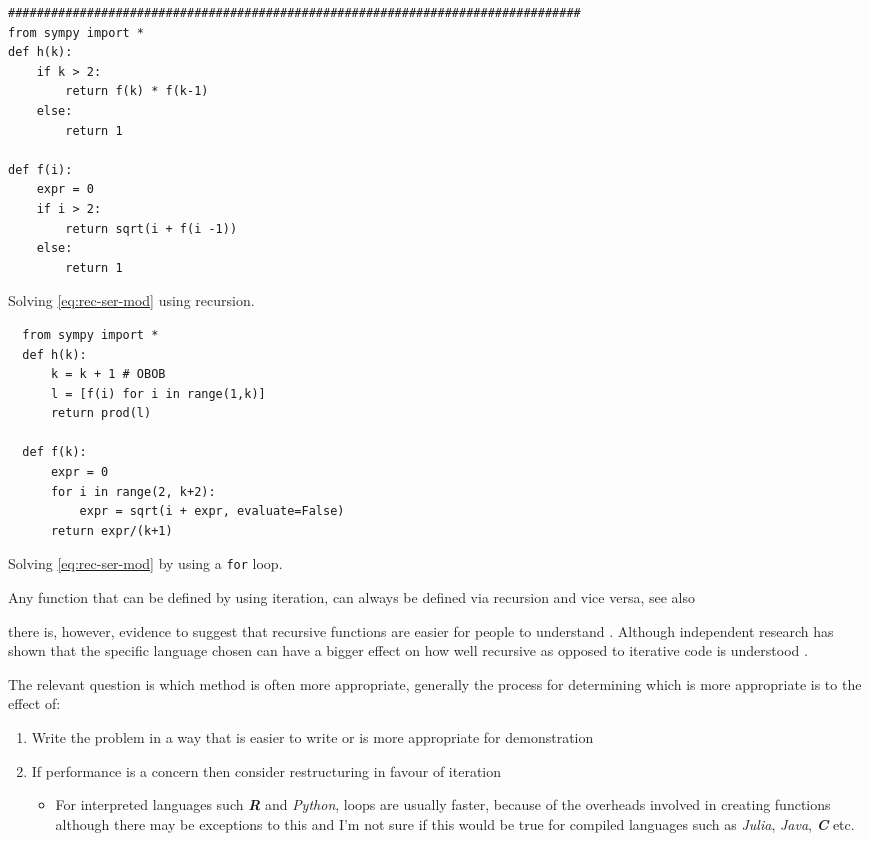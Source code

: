 \documentclass[11pt]{article}
\begin{document}
\begin{listing}[htbp]
\begin{verbatim}
################################################################################
from sympy import *
def h(k):
    if k > 2:
        return f(k) * f(k-1)
    else:
        return 1

def f(i):
    expr = 0
    if i > 2:
        return sqrt(i + f(i -1))
    else:
        return 1
\end{verbatim}
\caption{\label{rec-one}Solving \eqref{eq:rec-ser-mod} using recursion.}
\end{listing}


\begin{listing}[htbp]
\begin{verbatim}
  from sympy import *
  def h(k):
      k = k + 1 # OBOB
      l = [f(i) for i in range(1,k)]
      return prod(l)

  def f(k):
      expr = 0
      for i in range(2, k+2):
          expr = sqrt(i + expr, evaluate=False)
      return expr/(k+1)
\end{verbatim}
\caption{\label{it-one}Solving \eqref{eq:rec-ser-mod} by using a \texttt{for} loop.}
\end{listing}

Any function that can be defined by using iteration, can always be defined via
recursion and vice versa,
\cite{bohmReducingRecursionIteration1988,bohmReducingRecursionIteration1986}
see also
\cite{smolarskiMath60Notes2000,IterationVsRecursion2016}

there is, however, evidence to suggest that recursive functions are easier for people to understand \cite{benanderEmpiricalAnalysisDebugging2000} . Although independent research has shown that the specific language chosen can have a bigger effect on how well recursive as opposed to iterative code is understood \cite{sinhaCognitiveFitEmpirical1992}.

The relevant question is which method is often more appropriate, generally the process for
determining which is more appropriate is to the effect of:

\begin{enumerate}
\item Write the problem in a way that is easier to write or is more
appropriate for demonstration
\item If performance is a concern then consider restructuring in favour of iteration
\begin{itemize}
\item For interpreted languages such \textbf{\emph{R}} and \emph{Python}, loops are usually
faster, because of the overheads involved in creating functions
\cite{smolarskiMath60Notes2000} although there may be exceptions to this and
I'm not sure if this would be true for compiled languages such as \emph{Julia},
\emph{Java}, \textbf{\emph{C}} etc.
\end{itemize}
\end{enumerate}
\end{document}
